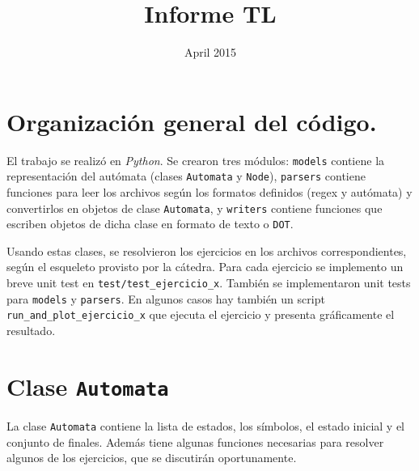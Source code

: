 \documentclass{article}
\title{Informe TL}
\date{April 2015}
\begin{document}

%



\begin{titlepage}
\maketitle
\thispagestyle{empty}
\end{titlepage} 

\newcommand{\Hopcroft}{\emph{Introduction to Automata Theory...} \citep{hopcroft}}


%

\section*{Organización general del código.}
El trabajo se realizó en \emph{Python}.  Se crearon tres módulos: \texttt{models} contiene la representación del autómata (clases \texttt{Automata} y \texttt{Node}), \texttt{parsers}  contiene funciones para leer los archivos según los formatos definidos (regex y autómata) y convertirlos en objetos de clase \texttt{Automata}, y \texttt{writers} contiene funciones que escriben objetos de dicha clase en formato de texto o \texttt{DOT}.  

Usando estas clases, se resolvieron los ejercicios en los archivos correspondientes, según el esqueleto provisto por la cátedra.  Para cada ejercicio se implemento un breve unit test en \texttt{test/test\_ejercicio\_x}.  También se implementaron unit tests para \texttt{models} y \texttt{parsers}.  En algunos casos hay también un script \texttt{run\_and\_plot\_ejercicio\_x} que ejecuta el ejercicio y presenta gráficamente el resultado.

\section*{Clase \texttt{Automata}}
La clase \texttt{Automata} contiene la lista de estados, los símbolos, el estado inicial y el
conjunto de finales.  Además tiene algunas funciones necesarias para resolver algunos de los
ejercicios, que se discutirán oportunamente.
\end{document}
